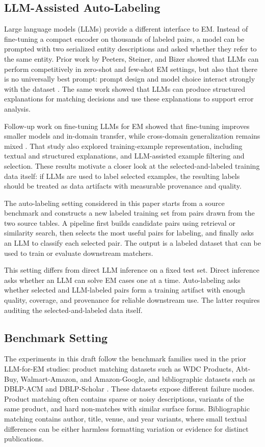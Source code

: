 \subsection{LLM-Assisted Auto-Labeling}

Large language models (LLMs) provide a different interface to EM. Instead of fine-tuning a compact encoder on thousands of labeled pairs, a model can be prompted with two serialized entity descriptions and asked whether they refer to the same entity. Prior work by Peeters, Steiner, and Bizer showed that LLMs can perform competitively in zero-shot and few-shot EM settings, but also that there is no universally best prompt: prompt design and model choice interact strongly with the dataset \cite{peeters2025llmem}. The same work showed that LLMs can produce structured explanations for matching decisions and use these explanations to support error analysis.

Follow-up work on fine-tuning LLMs for EM showed that fine-tuning improves smaller models and in-domain transfer, while cross-domain generalization remains mixed \cite{steiner2025finetuning}. That study also explored training-example representation, including textual and structured explanations, and LLM-assisted example filtering and selection. These results motivate a closer look at the selected-and-labeled training data itself: if LLMs are used to label selected examples, the resulting labels should be treated as data artifacts with measurable provenance and quality.

The auto-labeling setting considered in this paper starts from a source benchmark and constructs a new labeled training set from pairs drawn from the two source tables. A pipeline first builds candidate pairs using retrieval or similarity search, then selects the most useful pairs for labeling, and finally asks an LLM to classify each selected pair. The output is a labeled dataset that can be used to train or evaluate downstream matchers.

This setting differs from direct LLM inference on a fixed test set. Direct inference asks whether an LLM can solve EM cases one at a time. Auto-labeling asks whether selected and LLM-labeled pairs form a training artifact with enough quality, coverage, and provenance for reliable downstream use. The latter requires auditing the selected-and-labeled data itself.

\subsection{Benchmark Setting}

The experiments in this draft follow the benchmark families used in the prior LLM-for-EM studies: product matching datasets such as WDC Products, Abt-Buy, Walmart-Amazon, and Amazon-Google, and bibliographic datasets such as DBLP-ACM and DBLP-Scholar \cite{peeters2025llmem,steiner2025finetuning}. These datasets expose different failure modes. Product matching often contains sparse or noisy descriptions, variants of the same product, and hard non-matches with similar surface forms. Bibliographic matching contains author, title, venue, and year variants, where small textual differences can be either harmless formatting variation or evidence for distinct publications.
